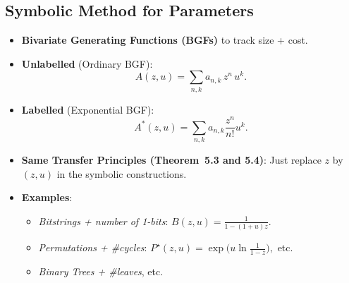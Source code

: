 \documentclass[11pt,letterpaper]{article}
\begin{document}
\subsection{Symbolic Method for Parameters}
\begin{itemize}
  \item \textbf{Bivariate Generating Functions (BGFs)} to track size + cost.
  \item \textbf{Unlabelled} (Ordinary BGF):
    \[
      A(z,u)=\sum_{n,k} a_{n,k}\,z^n\,u^k.
    \]
  \item \textbf{Labelled} (Exponential BGF):
    \[
      A^*(z,u)=\sum_{n,k} a_{n,k}\frac{z^n}{n!}u^k.
    \]
  \item \textbf{Same Transfer Principles (Theorem~5.3 and 5.4)}: Just replace $z$ by $(z,u)$ in the symbolic constructions.
  \item \textbf{Examples}:
    \begin{itemize}
      \item \emph{Bitstrings + number of 1-bits}: $B(z,u)=\frac{1}{1-(1+u)z}.$
      \item \emph{Permutations + \#cycles}: $P^\star(z,u)=\exp\bigl(u\ln\frac{1}{1-z}\bigr),$ etc.
      \item \emph{Binary Trees + \#leaves}, etc.
    \end{itemize}
\end{itemize}

\end{document}
